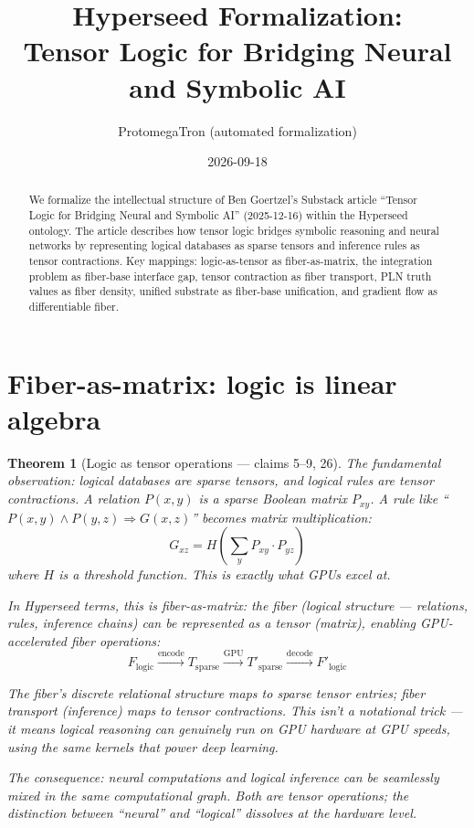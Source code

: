 \documentclass[11pt,a4paper]{article}
\title{Hyperseed Formalization:\\
  Tensor Logic for Bridging Neural and Symbolic AI}
\author{ProtomegaTron (automated formalization)}
\date{2026-09-18}
\newtheorem{theorem}[definition]{Theorem}
\begin{document}
\maketitle

\begin{abstract}
We formalize the intellectual structure of Ben Goertzel's Substack article
``Tensor Logic for Bridging Neural and Symbolic AI'' (2025-12-16) within
the Hyperseed ontology. The article describes how tensor logic bridges
symbolic reasoning and neural networks by representing logical databases
as sparse tensors and inference rules as tensor contractions. Key mappings:
logic-as-tensor as fiber-as-matrix, the integration problem as fiber-base
interface gap, tensor contraction as fiber transport, PLN truth values as
fiber density, unified substrate as fiber-base unification, and gradient
flow as differentiable fiber.
\end{abstract}

\tableofcontents

\section{Fiber-as-matrix: logic is linear algebra}
\label{sec:fiber}

\begin{theorem}[Logic as tensor operations --- claims 5--9, 26]
\label{thm:logic}
The fundamental observation: logical databases are sparse tensors, and
logical rules are tensor contractions. A relation $P(x,y)$ is a sparse
Boolean matrix $P_{xy}$. A rule like ``$P(x,y) \wedge P(y,z) \Rightarrow
G(x,z)$'' becomes matrix multiplication:
\[
  G_{xz} = H\left(\sum_y P_{xy} \cdot P_{yz}\right)
\]
where $H$ is a threshold function. This is exactly what GPUs excel at.

In Hyperseed terms, this is \emph{fiber-as-matrix}: the fiber (logical
structure --- relations, rules, inference chains) can be represented as
a tensor (matrix), enabling GPU-accelerated fiber operations:
\[
  F_{\text{logic}} \xrightarrow{\text{encode}} T_{\text{sparse}}
  \xrightarrow{\text{GPU}} T'_{\text{sparse}}
  \xrightarrow{\text{decode}} F'_{\text{logic}}
\]

The fiber's discrete relational structure maps to sparse tensor entries;
fiber transport (inference) maps to tensor contractions. This isn't a
notational trick --- it means logical reasoning can genuinely run on GPU
hardware at GPU speeds, using the same kernels that power deep learning.

The consequence: neural computations and logical inference can be seamlessly
mixed in the same computational graph. Both are tensor operations; the
distinction between ``neural'' and ``logical'' dissolves at the hardware
level.
\end{theorem}
\end{document}
